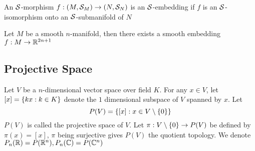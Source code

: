\begin{definition}
	An $\mathcal{S}$-morphism $f: (M, \mathcal{S}_M) \to (N, \mathcal{S}_N)$ is an $\mathcal{S}$-embedding if $f$ is an $\mathcal{S}$-isomorphism onto an $\mathcal{S}$-submanifold of $N$
\end{definition}

\begin{theorem}[Whitney]
	Let $M$ be a smooth $n$-manifold, then there exists a smooth embedding $f: M \to \mathbb{R}^{2n+1}$
\end{theorem}

\subsection{Projective Space}

\begin{definition}
	Let $V$ be a $n$-dimensional vector space over field $K$. For any $x \in V$, let $[x] = \{kx: k \in K\}$ denote the $1$ dimensional subspace of $V$ spanned by $x$. Let
	$$
	P(V) = \{[x]: x \in V \setminus \{0\}\}
	$$
	$P(V)$ is called the projective space of $V$. Let $\pi: V \setminus \{0\} \to P(V)$ be defined by $\pi(x) = [x]$, $\pi$ being surjective gives $P(V)$ the quotient topology. We denote $P_n(\mathbb{R}) = P(\mathbb{R}^n), P_n(\mathbb{C}) = P(\mathbb{C}^n)$
\end{definition}

